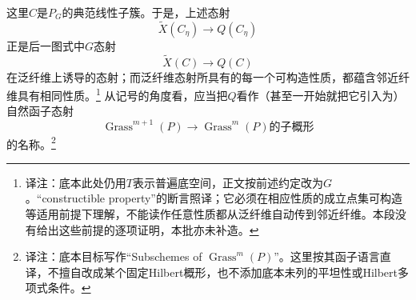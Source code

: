 \documentclass[openany,fontset=fandol]{ctexbook}
\newcommand{\note}[1]{\unskip\nobreak\footnote{译注：#1}}
\begin{document}
\newpage
这里$C$是$P_G$的典范线性子簇。于是，上述态射
\[
\widetilde X(C_\eta)\longrightarrow Q(C_\eta)
\]
正是后一图式中$G$态射
\[
\widetilde X(C)\longrightarrow Q(C)
\]
在泛纤维上诱导的态射；而泛纤维态射所具有的每一个可构造性质，都蕴含邻近纤维具有相同性质。\note{底本此处仍用$T$表示普遍底空间，正文按前述约定改为$G$。“constructible property”的断言照译；它必须在相应性质的成立点集可构造等适用前提下理解，不能读作任意性质都从泛纤维自动传到邻近纤维。本段没有给出这些前提的逐项证明，本批亦未补造。}
从记号的角度看，应当把$Q$看作（甚至一开始就把它引入为）自然函子态射
\[
\operatorname{Grass}^{m+1}(P)
\longrightarrow
\text{$\operatorname{Grass}^{m}(P)$的子概形}
\]
的名称。\note{底本目标写作“Subschemes of $\operatorname{Grass}^{m}(P)$”。这里按其函子语言直译，不擅自改成某个固定Hilbert概形，也不添加底本未列的平坦性或Hilbert多项式条件。}
\end{document}
